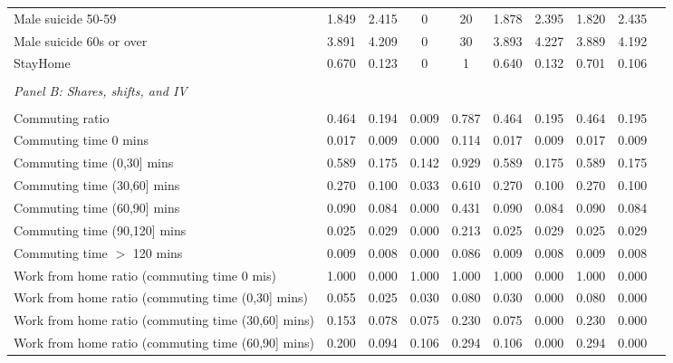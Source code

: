 \begin{tabular}{l*{9}{c}}
Male suicide 50-59  &       1.849&       2.415&           0&          20&       1.878&       2.395&       1.820&       2.435\\
Male suicide 60s or over&       3.891&       4.209&           0&          30&       3.893&       4.227&       3.889&       4.192\\
StayHome            &       0.670&       0.123&           0&           1&       0.640&       0.132&       0.701&       0.106\\
\\ \multicolumn{1}{l}{\textit{Panel B: Shares, shifts, and IV}} \\\\[-1ex]
Commuting ratio     &       0.464&       0.194&       0.009&       0.787&       0.464&       0.195&       0.464&       0.195\\
Commuting time 0 mins&       0.017&       0.009&       0.000&       0.114&       0.017&       0.009&       0.017&       0.009\\
Commuting time (0,30] mins&       0.589&       0.175&       0.142&       0.929&       0.589&       0.175&       0.589&       0.175\\
Commuting time (30,60] mins&       0.270&       0.100&       0.033&       0.610&       0.270&       0.100&       0.270&       0.100\\
Commuting time (60,90] mins&       0.090&       0.084&       0.000&       0.431&       0.090&       0.084&       0.090&       0.084\\
Commuting time (90,120] mins&       0.025&       0.029&       0.000&       0.213&       0.025&       0.029&       0.025&       0.029\\
Commuting time $>$ 120 mins&       0.009&       0.008&       0.000&       0.086&       0.009&       0.008&       0.009&       0.008\\
Work from home ratio (commuting time 0 mis)&       1.000&       0.000&       1.000&       1.000&       1.000&       0.000&       1.000&       0.000\\
Work from home ratio (commuting time (0,30] mins)&       0.055&       0.025&       0.030&       0.080&       0.030&       0.000&       0.080&       0.000\\
Work from home ratio (commuting time (30,60] mins)&       0.153&       0.078&       0.075&       0.230&       0.075&       0.000&       0.230&       0.000\\
Work from home ratio (commuting time (60,90] mins)&       0.200&       0.094&       0.106&       0.294&       0.106&       0.000&       0.294&       0.000\\

\end{tabular}
